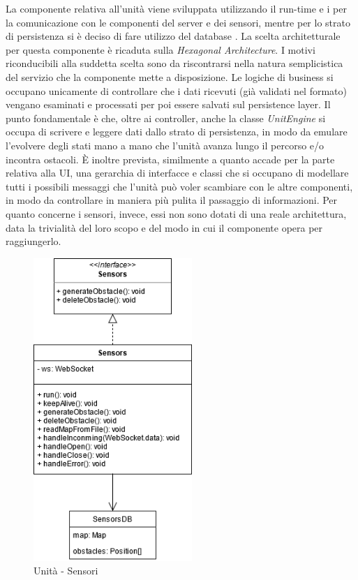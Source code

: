 La componente relativa all'unità viene sviluppata utilizzando il run-time  e i  per la comunicazione con le componenti del server e dei sensori, mentre per lo strato di persistenza si è deciso di fare utilizzo del database .
La scelta architetturale per questa componente è ricaduta sulla \textit{Hexagonal Architecture}.
I motivi riconducibili alla suddetta scelta sono da riscontrarsi nella natura semplicistica del servizio che la componente mette a disposizione. Le logiche di business si occupano unicamente di controllare che i dati ricevuti (già validati nel formato) vengano esaminati e processati per poi essere salvati sul persistence layer.
Il punto fondamentale è che, oltre ai controller, anche la classe \textit{UnitEngine} si occupa di scrivere e leggere dati dallo strato di persistenza, in modo da emulare l'evolvere degli stati mano a mano che l'unità avanza lungo il percorso e/o incontra ostacoli.
È inoltre prevista, similmente a quanto accade per la parte relativa alla UI, una gerarchia di interfacce e classi che si occupano di modellare tutti i possibili messaggi che l'unità può voler scambiare con le altre componenti, in modo da controllare in maniera più pulita il passaggio di informazioni.
Per quanto concerne i sensori, invece, essi non sono dotati di una reale architettura, data la trivialità del loro scopo e del modo in cui il componente opera per raggiungerlo.

\begin{figure}[H]
	\centering
	\includegraphics[width=6cm]{img/unit_sensori.png}
	\caption{Unità - Sensori}
\end{figure}

